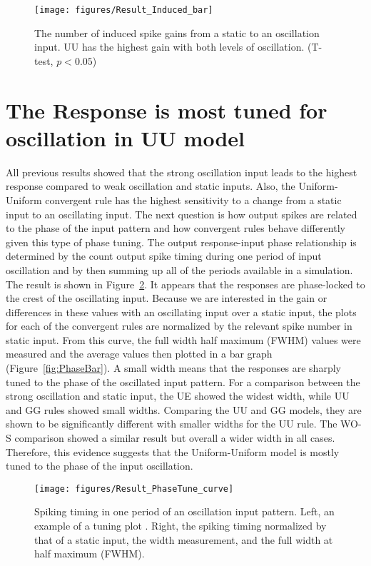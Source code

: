 \begin{figure}[!h]
	\centering
	\texttt{[image: figures/Result\_Induced\_bar]}
	\caption{The number of induced spike gains from a static to an oscillation input. UU has the highest gain with both levels of oscillation. (T-test, $p < 0.05$)} %
	\label{fig:InduceBar}
\end{figure}

\section{The Response is most tuned for oscillation in UU model}
 All previous results showed that the strong oscillation input leads to the highest response compared to weak oscillation and static inputs. Also, the Uniform-Uniform convergent rule has the highest sensitivity to a change from a static input to an oscillating input. 
The next question is how output spikes are related to the phase of the input pattern and how convergent rules behave differently given this type of phase tuning. 
The output response-input phase relationship is determined by the count output spike timing during one period of input oscillation and by then summing up all of the periods available in a simulation. The result is shown in Figure~\ref{fig:PhaseCurve}. It appears that the responses are phase-locked to the crest of the oscillating input.
Because we are interested in the gain or differences in these values with an oscillating input over a static input, the plots for each of the convergent rules are normalized by the relevant spike number in static input. From this curve, the full width half maximum (FWHM) values were measured and the average values then plotted in a bar graph (Figure~\ref{fig:PhaseBar}). A small width means that the responses are sharply tuned to the phase of the oscillated input pattern. For a comparison between the strong oscillation and static input, the UE showed the widest width, while UU and GG rules showed small widths. Comparing the UU and GG models, they are shown to be significantly different with smaller widths for the UU rule. The WO-S comparison showed a similar result but overall a wider width in all cases. Therefore, this evidence suggests that the Uniform-Uniform model is mostly tuned to the phase of the input oscillation.




\begin{figure}[!h]
	\centering
	\texttt{[image: figures/Result\_PhaseTune\_curve]}
	\caption{Spiking timing in one period of an oscillation input pattern. Left, an example of a tuning plot . Right, the spiking timing normalized by that of a static input, the width measurement, and the full width at half maximum (FWHM).} 			\label{fig:PhaseCurve}
\end{figure}

